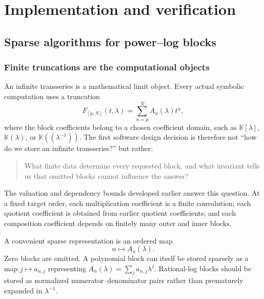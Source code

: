 \documentclass[11pt,openany]{book}
\theoremstyle{definition}
\theoremstyle{plain}
\theoremstyle{remark}
\newcommand{\K}{\mathbb{K}}
\begin{document}

\part{Implementation and verification}\label{part:implementation}

\chapter{Sparse algorithms for power--log blocks}\label{ch:implementation}

\section{Finite truncations are the computational objects}
An infinite transseries is a mathematical limit object. Every actual symbolic computation uses a truncation
\begin{equation}\label{eq:finite-truncation-data}
 F_{[p,N]}(t,\lambda)=\sum_{n=p}^{N} A_n(\lambda)t^n,
\end{equation}
where the block coefficients belong to a chosen coefficient domain, such as \(\K[\lambda]\), \(\K(\lambda)\), or \(\K((\lambda^{-1}))\). The first software design decision is therefore not ``how do we store an infinite transseries?'' but rather:
\begin{quote}
What finite data determine every requested block, and what invariant tells us that omitted blocks cannot influence the answer?
\end{quote}
The valuation and dependency bounds developed earlier answer this question. At a fixed target order, each multiplication coefficient is a finite convolution; each quotient coefficient is obtained from earlier quotient coefficients; and each composition coefficient depends on finitely many outer and inner blocks.

A convenient sparse representation is an ordered map
\[
 n\longmapsto A_n(\lambda).
\]
Zero blocks are omitted. A polynomial block can itself be stored sparsely as a map \(j\mapsto a_{n,j}\) representing \(A_n(\lambda)=\sum_j a_{n,j}\lambda^j\). Rational-log blocks should be stored as normalized numerator--denominator pairs rather than prematurely expanded in \(\lambda^{-1}\).

\end{document}
